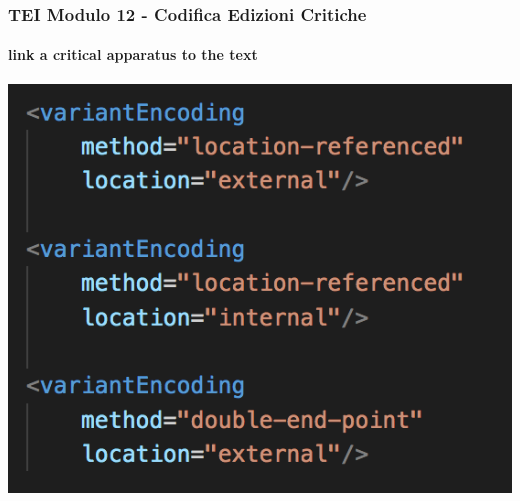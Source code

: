 \begin{frame}
    \frametitle{TEI Modulo 12 - Codifica Edizioni Critiche}
    \framesubtitle{link a critical apparatus to the text}
    \addtocounter{nframe}{1}
    

    \begin{center}
       \includegraphics[width=.95\textwidth]{imgs/variantEncoding.png}
    \end{center}

\end{frame}



